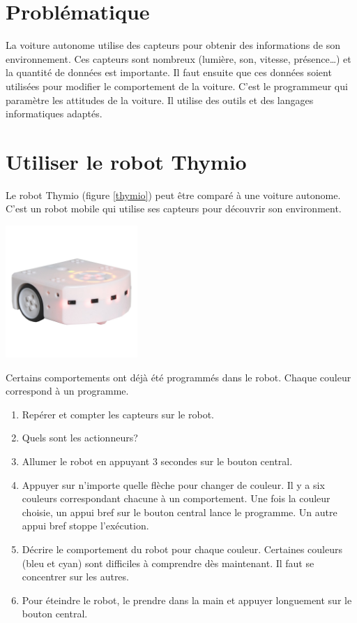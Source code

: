 \documentclass[a4paper,11pt]{article}
\begin{document}
\section{Problématique}
La voiture autonome utilise des capteurs pour obtenir des informations de son environnement. Ces capteurs sont nombreux (lumière, son, vitesse, présence\dots) et la quantité de données est importante. Il faut ensuite que ces données soient utilisées pour modifier le comportement de la voiture. C'est le programmeur qui paramètre les attitudes de la voiture. Il utilise des outils et des langages informatiques adaptés.
\begin{center}
\end{center}
\section{Utiliser le robot Thymio}
Le robot Thymio (figure \ref{thymio}) peut être comparé à une voiture autonome. C'est un robot mobile qui utilise ses capteurs pour découvrir son environment.
\begin{center}
\centering
\includegraphics[width=5cm]{ressources/robot-thymio.jpg}
\label{thymio}
\end{center}
Certains comportements ont déjà été programmés dans le robot. Chaque couleur correspond à un programme.
\begin{activite}
\begin{enumerate}
    \item Repérer et compter les capteurs sur le robot.
    \item Quels sont les actionneurs?
    \item Allumer le robot en appuyant 3 secondes sur le bouton central.
    \item Appuyer sur n'importe quelle flèche pour changer de couleur. Il y a six couleurs correspondant chacune à un comportement. Une fois la couleur choisie, un appui bref sur le bouton central lance le programme. Un autre appui bref stoppe l'exécution.
    \item Décrire le comportement du robot pour chaque couleur. Certaines couleurs (bleu et cyan) sont difficiles à comprendre dès maintenant. Il faut se concentrer sur les autres.
    \item Pour éteindre le robot, le prendre dans la main et appuyer longuement sur le bouton central.
\end{enumerate}
\end{activite}
\end{document}
